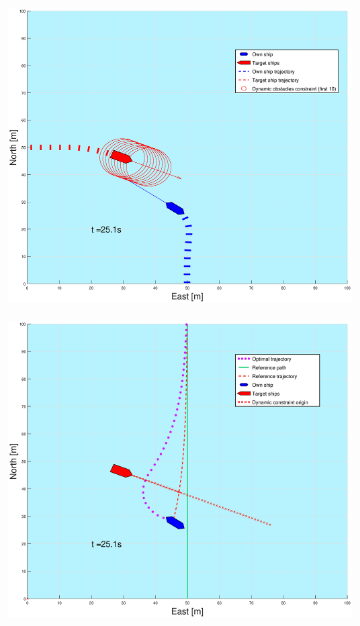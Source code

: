 \begin{figure}[ht!]
\begin{subfigure}[b]{0.499\textwidth}
    \end{subfigure}
    \hfill
    \\
    \begin{subfigure}[b]{0.49\textwidth}
        \centering
        \includegraphics[width=\textwidth]{Images/Figures/enkel_SO/_Simple_1fig1_time=25}
    \end{subfigure}
    \hfill
    \begin{subfigure}[b]{0.499\textwidth}
        \centering
        \includegraphics[width=\textwidth]{Images/Figures/enkel_SO/_Simple_1fig999_time=25}

\end{subfigure}
\end{figure}
